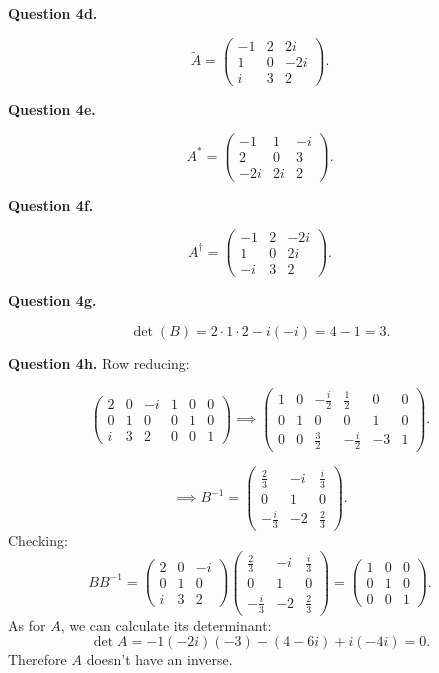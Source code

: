 \documentclass[letterpaper, reqno,11pt]{article}
\begin{document}
{\noindent\bf Question 4d.} 

\[
    \tilde A=\begin{pmatrix} -1&2&2i\\1&0&-2i\\i&3&2 \end{pmatrix} 
.\]

{\noindent\bf Question 4e.} 

\[
    A^*=\begin{pmatrix} -1&1&-i\\2&0&3\\-2i&2i&2 \end{pmatrix} 
.\]

{\noindent\bf Question 4f.} 

\[
    A^\dagger=\begin{pmatrix} -1&2&-2i\\1&0&2i\\-i&3&2 \end{pmatrix} 
.\]

{\noindent\bf Question 4g.} 

\[
\det(B)=2\cdot 1\cdot 2-i(-i)=4-1=3
.\]

{\noindent\bf Question 4h.} Row reducing: 

\[
    \begin{pmatrix} 2&0&-i&1&0&0\\0&1&0&0&1&0\\i&3&2&0&0&1 \end{pmatrix} \implies \begin{pmatrix} 1&0&-\frac{i}{2}&\frac{1}{2}&0&0\\0&1&0&0&1&0\\0&0&\frac{3}{2}&-\frac{i}{2}&-3&1 \end{pmatrix} 
.\]

\[
    \implies B^{-1}=\begin{pmatrix} \frac{2}{3}&-i&\frac{i}{3}\\0&1&0\\-\frac{i}{3}&-2&\frac{2}{3} \end{pmatrix} 
.\]
Checking:
\[
    BB^{-1}=\begin{pmatrix} 2&0&-i\\0&1&0\\i&3&2 \end{pmatrix}\begin{pmatrix} \frac{2}{3}&-i&\frac{i}{3}\\0&1&0\\-\frac{i}{3}&-2&\frac{2}{3} \end{pmatrix}=\begin{pmatrix} 1&0&0\\0&1&0\\0&0&1 \end{pmatrix} 
.\]
As for $A$, we can calculate its determinant: 
\[
\det A=-1(-2i)(-3)-(4-6i)+i(-4i)=0
.\]
Therefore $A$ doesn't have an inverse. 
\end{document}
